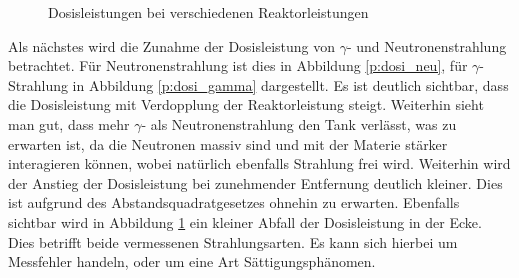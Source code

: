         \begin{figure}
            \caption{Dosisleistungen bei verschiedenen Reaktorleistungen}
            \label{df:dosi_g_n}                    
        \end{figure}
    Als nächstes wird die Zunahme der Dosisleistung von $\gamma$- und Neutronenstrahlung betrachtet. Für Neutronenstrahlung ist dies in Abbildung \ref{p:dosi_neu}, für $\gamma$-Strahlung in Abbildung \ref{p:dosi_gamma} dargestellt.
    Es ist deutlich sichtbar, dass die Dosisleistung mit Verdopplung der Reaktorleistung steigt. Weiterhin sieht man gut, dass mehr $\gamma$- als Neutronenstrahlung den Tank verlässt, was zu erwarten ist, da die Neutronen massiv sind und mit der Materie stärker interagieren können, wobei natürlich ebenfalls Strahlung frei wird.
    Weiterhin wird der Anstieg der Dosisleistung bei zunehmender Entfernung deutlich kleiner. Dies ist aufgrund des Abstandsquadratgesetzes ohnehin zu erwarten.
    Ebenfalls sichtbar wird in Abbildung \ref{df:dosi_g_n} ein kleiner Abfall der Dosisleistung in der Ecke. Dies betrifft beide vermessenen Strahlungsarten. Es kann sich hierbei um Messfehler handeln, oder um eine Art Sättigungsphänomen.
    
